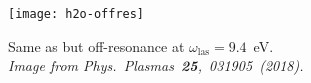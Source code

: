 \documentclass[11pt,a4paper]{article}
\begin{document}
			\begin{figure}[!htbp]
				\centering
				\texttt{[image: h2o-offres]}
				\caption{Same as  but off-resonance at $\omega_\mathrm{las}=9.4$~eV. \\{\sffamily\itshape Image from Phys.~Plasmas~\textbf{25},~031905~(2018).}}\label{fig:h2o-offres}
			\end{figure}
			
			
			
								
	
\end{document}
